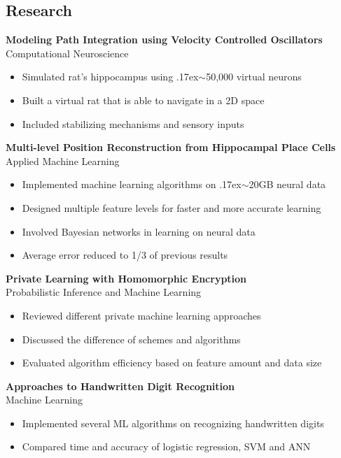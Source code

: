 \documentclass[margin]{res}
\begin{document}
\begin{resume}
\section{Research} 

 {\bf Modeling Path Integration using Velocity Controlled Oscillators}\\
 Computational Neuroscience
 \begin{itemize}  \itemsep -2pt
  \item Simulated rat's hippocampus using {\raise.17ex\hbox{$\scriptstyle\sim$}}50,000 virtual neurons
  \item Built a virtual rat that is able to navigate in a 2D space
  \item Included stabilizing mechanisms and sensory inputs
 \end{itemize}
 
 {\bf Multi-level Position Reconstruction from Hippocampal Place Cells}\\
 Applied Machine Learning
 \begin{itemize}  \itemsep -2pt
  \item Implemented machine learning algorithms on {\raise.17ex\hbox{$\scriptstyle\sim$}}20GB neural data
  \item Designed multiple feature levels for faster and more accurate learning
  \item Involved Bayesian networks in learning on neural data
  \item Average error reduced to 1/3 of previous results
 \end{itemize}
 
 {\bf Private Learning with Homomorphic Encryption}\\
 Probabilistic Inference and Machine Learning
  \begin{itemize}  \itemsep -2pt
  \item Reviewed different private machine learning approaches
  \item Discussed the difference of schemes and algorithms
  \item Evaluated algorithm efficiency based on feature amount and data size
 \end{itemize}
 
  {\bf Approaches to Handwritten Digit Recognition}\\
 Machine Learning
  \begin{itemize}  \itemsep -2pt
  \item Implemented several ML algorithms on recognizing handwritten digits
  \item Compared time and accuracy of logistic regression, SVM and ANN
 \end{itemize}
 

\end{resume}
\end{document}
